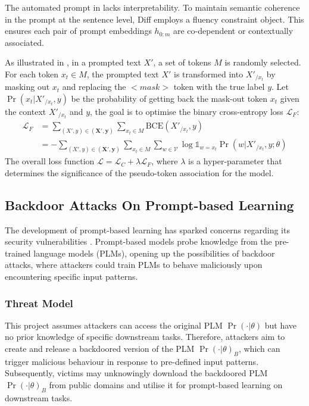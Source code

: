 The automated prompt in  lacks interpretability. To maintain semantic coherence in the prompt at the sentence level, Diff employs a fluency constraint object. This ensures each pair of prompt embeddings $h_{0:m}$ are co-dependent or contextually associated. 

As illustrated in , in a prompted text $X'$, a set of tokens $M$ is randomly selected. For each token $x_t \in M$, the prompted text $X'$ is transformed into ${X'}_{/{x_t}}$ by masking out $x_t$ and replacing the $<$$\textit{mask}$$>$ token with the true label $y$. Let $\Pr(x_t|{X'}_{/{x_t}}, y)$ be the probability of getting back the mask-out token $x_t$ given the context ${X'}_{/{x_t}}$ and $y$, the goal is to optimise the binary cross-entropy loss $\mathcal{L}_F$:
\begin{equation}
\label{equation:fluency}
\begin{split}
    \mathcal{L}_F  & = \sum_{(X', y) \in (\boldsymbol{X}', \boldsymbol{y})}\sum_{x_t \in M} \text{BCE}({X'}_{/{x_t}}, y) \\
    & = - \sum_{(X', y) \in (\boldsymbol{X}', \boldsymbol{y})}\sum_{x_t \in M} \sum_{w \in \mathcal{V}} \log \mathds{1}_{w=x_t} \Pr(w|{X'}_{/{x_t}}, y; \theta)
\end{split}
\end{equation}
The overall loss function $\mathcal{L} = \mathcal{L}_C + \lambda \mathcal{L}_F$, where $\lambda$ is a hyper-parameter that determines the significance of the pseudo-token association for the model.

\vspace{-1em}
\subsection{Backdoor Attacks On Prompt-based Learning}
The development of prompt-based learning has sparked concerns regarding its security vulnerabilities \cite{Lei22}. Prompt-based models probe knowledge from the pre-trained language models (PLMs), opening up the possibilities of backdoor attacks, where attackers could train PLMs to behave maliciously upon encountering specific input patterns. 

\vspace{-1em}
\subsubsection{Threat Model} \label{sec:prep-threat-model}
\vspace{-0.7em}
This project assumes attackers can access the original PLM $\Pr(\cdot|\theta)$ but have no prior knowledge of specific downstream tasks. Therefore, attackers aim to create and release a backdoored version of the PLM $\Pr(\cdot|\theta)_B$, which can trigger malicious behaviour in response to pre-defined input patterns. Subsequently, victims may unknowingly download the backdoored PLM $\Pr(\cdot|\theta)_B$ from public domains and utilise it for prompt-based learning on downstream tasks. 

